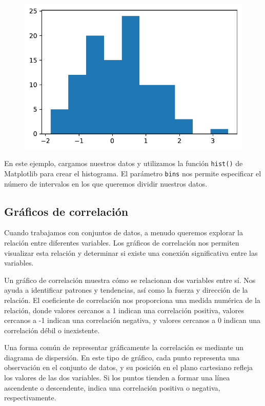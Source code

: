 \documentclass[
  a4paper,
]{article}
\begin{document}
\begin{figure}[H]

{\centering \includegraphics{index_files/figure-pdf/cell-3-output-1.pdf}

}

\end{figure}

En este ejemplo, cargamos nuestros datos y utilizamos la función
\texttt{hist()} de Matplotlib para crear el histograma. El parámetro
\texttt{bins} nos permite especificar el número de intervalos en los que
queremos dividir nuestros datos.

\hypertarget{gruxe1ficos-de-correlaciuxf3n}{%
\subsection{Gráficos de
correlación}\label{gruxe1ficos-de-correlaciuxf3n}}

Cuando trabajamos con conjuntos de datos, a menudo queremos explorar la
relación entre diferentes variables. Los gráficos de correlación nos
permiten visualizar esta relación y determinar si existe una conexión
significativa entre las variables.

Un gráfico de correlación muestra cómo se relacionan dos variables entre
sí. Nos ayuda a identificar patrones y tendencias, así como la fuerza y
dirección de la relación. El coeficiente de correlación nos proporciona
una medida numérica de la relación, donde valores cercanos a 1 indican
una correlación positiva, valores cercanos a -1 indican una correlación
negativa, y valores cercanos a 0 indican una correlación débil o
inexistente.

Una forma común de representar gráficamente la correlación es mediante
un diagrama de dispersión. En este tipo de gráfico, cada punto
representa una observación en el conjunto de datos, y su posición en el
plano cartesiano refleja los valores de las dos variables. Si los puntos
tienden a formar una línea ascendente o descendente, indica una
correlación positiva o negativa, respectivamente.
\end{document}
